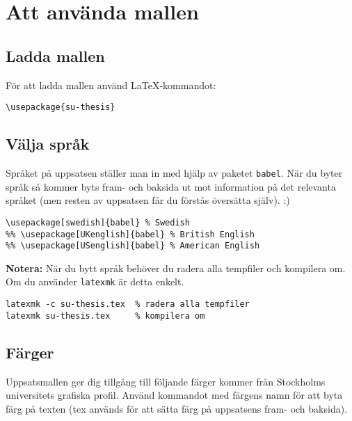
\section{Att använda mallen}
\label{mallen}


\subsection{Ladda mallen}
\label{ladda}

För att ladda mallen använd \LaTeX{}-kommandot:

\begin{verbatim}
\usepackage{su-thesis}
\end{verbatim}


\subsection{Välja språk}
\label{språk}

\noindent Språket på uppsatsen ställer man in med hjälp av paketet
\texttt{babel}. När du byter språk så kommer byts fram- och baksida ut mot
information på det relevanta språket (men resten av uppsatsen får du förstås
översätta själv). :)

\begin{verbatim}
\usepackage[swedish]{babel} % Swedish
%% \usepackage[UKenglish]{babel} % British English
%% \usepackage[USenglish]{babel} % American English
\end{verbatim}

\noindent\textbf{Notera:} När du bytt språk behöver du radera alla tempfiler
och kompilera om. Om du använder \texttt{latexmk} är detta enkelt.

\begin{verbatim}
latexmk -c su-thesis.tex  % radera alla tempfiler
latexmk su-thesis.tex     % kompilera om
\end{verbatim}


\subsection{Färger}
\label{färg}

Uppsatsmallen ger dig tillgång till följande färger kommer från Stockholms
universitets grafiska profil. Använd kommandot  med
färgens namn för att byta färg på texten (tex används
 för att sätta färg på uppsatsens fram- och
baksida).

